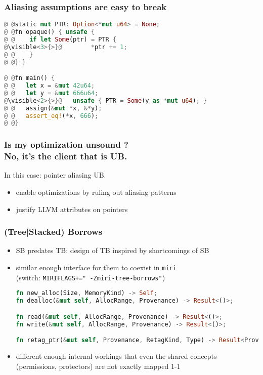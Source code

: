 \begin{frame}[fragile]
    \frametitle{Aliasing assumptions are easy to break}
    \begin{block}{}
        \begin{lstlisting}[language=rust, escapechar=@]
@ @static mut PTR: Option<*mut u64> = None;
@ @fn opaque() { unsafe {
@ @    if let Some(ptr) = PTR {
@\visible<3>{>}@        *ptr += 1;
@ @    }
@ @} }

@ @fn main() {
@ @   let x = &mut 42u64;
@ @   let y = &mut 666u64;
@\visible<2>{>}@   unsafe { PTR = Some(y as *mut u64); }
@ @   assign(&mut *x, &*y);
@ @   assert_eq!(*x, 666);
@ @}
        \end{lstlisting}
    \end{block}
\end{frame}

\begin{frame}
    \frametitle{Is my optimization unsound ?\\No, it's the client that is UB.}
    In this case: pointer aliasing UB.

    \begin{itemize}
        \item enable optimizations by ruling out aliasing patterns
        \item justify LLVM attributes on pointers
    \end{itemize}
\end{frame}

\begin{frame}[fragile]
    \frametitle{(Tree|Stacked) Borrows}
    \begin{itemize}
        \item SB predates TB: design of TB inspired by shortcomings of SB
        \item similar enough interface for them to coexist in \texttt{miri}\\
            (switch: \texttt{MIRIFLAGS+=" -Zmiri-tree-borrows"})
            \begin{minipage}{0.9\textwidth}
            \begin{block}{}
                \begin{lstlisting}[language=rust, basicstyle=\ttfamily\fontsize{7}{8}\selectfont]
fn new_alloc(Size, MemoryKind) -> Self;
fn dealloc(&mut self, AllocRange, Provenance) -> Result<()>;

fn read(&mut self, AllocRange, Provenance) -> Result<()>;
fn write(&mut self, AllocRange, Provenance) -> Result<()>;

fn retag_ptr(&mut self, Provenance, RetagKind, Type) -> Result<Provenance>;
                \end{lstlisting}
            \end{block}
            \end{minipage}
        \item different enough internal workings that even the shared
        concepts (permissions, protectors) are not exactly mapped 1-1
    \end{itemize}
\end{frame}

